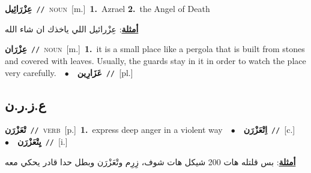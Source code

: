 \documentclass[10pt,a4paper,twoside]{article} %
\begin{document}
\begin{multicols}{2}
{\setlength\topsep{0pt}\textbf{\foreignlanguage{arabic}{عِزْرَائِيل}}\ {\color{gray}\texttt{//}\color{black}}\ \textsc{noun}\ [m.]\ \textbf{1.}~Azrael  \textbf{2.}~the Angel of Death\  \begin{flushright}\color{gray}\foreignlanguage{arabic}{\textbf{\underline{\foreignlanguage{arabic}{أمثلة}}}: عِزْرائيل اللي ياخذك ان شاء الله}\end{flushright}\color{black}} \vspace{2mm}

{\setlength\topsep{0pt}\textbf{\foreignlanguage{arabic}{عِزْرَان}}\ {\color{gray}\texttt{//}\color{black}}\ \textsc{noun}\ [m.]\ \textbf{1.}~it is a small place like a pergola that is built from stones and covered with leaves. Usually, the guards stay in it in order to watch the place very carefully.\ \ $\bullet$\ \ \setlength\topsep{0pt}\textbf{\foreignlanguage{arabic}{عَزَارِين}}\ {\color{gray}\texttt{//}\color{black}}\ [pl.]\ } \vspace{2mm}

\vspace{-3mm}
\subsection*{\color{blue}\foreignlanguage{arabic}{ع.ز.ر.ن}\color{blue}{}} 

{\setlength\topsep{0pt}\textbf{\foreignlanguage{arabic}{تْعَزْرَن}}\ {\color{gray}\texttt{//}\color{black}}\ \textsc{verb}\ [p.]\ \textbf{1.}~express deep anger in a violent way\ \ $\bullet$\ \ \setlength\topsep{0pt}\textbf{\foreignlanguage{arabic}{اِتْعَزْرَن}}\ {\color{gray}\texttt{//}\color{black}}\ [c.]\ \ $\bullet$\ \ \setlength\topsep{0pt}\textbf{\foreignlanguage{arabic}{يِتْعَزْرَن}}\ {\color{gray}\texttt{//}\color{black}}\ [i.]\  \begin{flushright}\color{gray}\foreignlanguage{arabic}{\textbf{\underline{\foreignlanguage{arabic}{أمثلة}}}: بس قلتله هات 200 شيكل هات شوف، زِرِم وتْعَزْرَن  وبطل حدا قادر يحكي معه}\end{flushright}\color{black}} \vspace{2mm}


\end{multicols}
\end{document}
